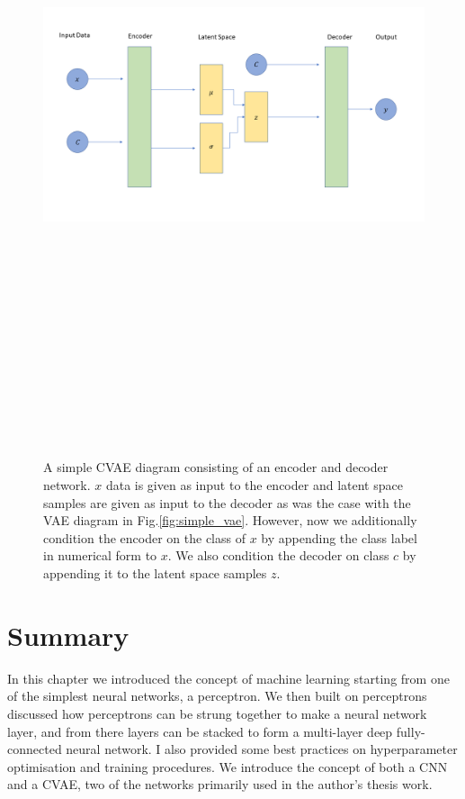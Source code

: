 \begin{figure}
    \centering
    \includegraphics[width=16cm,height=20cm,keepaspectratio]{figures/simple_cvae_diagram.png}
    \caption[Simple conditional variational autoencoder illustration.]{A simple \ac{CVAE} diagram consisting of an encoder and decoder network. $x$ data is given as input to the encoder and latent space samples are given as input to the decoder as was the case with the \ac{VAE} diagram in Fig.\ref{fig:simple_vae}. However, now we additionally condition the encoder on the class of $x$ by appending the class label in numerical form to $x$. We also condition the decoder on class $c$ by appending it to the latent space samples $z$.}
    \label{fig:simple_cvae}
\end{figure}

\section{Summary}

In this chapter we introduced the concept of machine learning 
starting from one of the simplest neural networks, a perceptron. We 
then built on perceptrons discussed how perceptrons can be strung 
together to make a neural network layer, and from there layers 
can be stacked to form a multi-layer deep fully-connected neural network. 
I also provided some best practices on hyperparameter optimisation and 
training procedures. We introduce the concept of both a \ac{CNN} 
and a \ac{CVAE}, two of the networks primarily used in the author's 
thesis work.